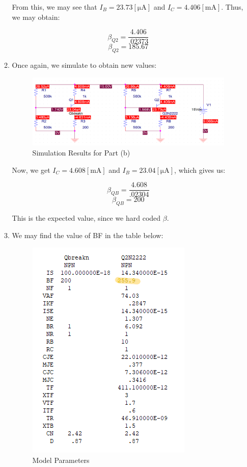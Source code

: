 \begin{enumerate}
\begin{enumerate}
        From this, we may see that $I_B=23.73[\si{\micro\ampere}]$ and $I_C=4.406[\si{\milli\ampere}]$. Thus, we may obtain:

        $$\beta_{Q2}=\frac{4.406}{.02373}$$
        $$\boxed{\beta_{Q2}=185.67}$$

      \item 

        Once again, we simulate to obtain new values:

        \begin{figure}[H]
          \centering
          \includegraphics[width=.9\textwidth]{Figures/HW5-5b}
          \caption{Simulation Results for Part (b)}
          \label{fig:2}
        \end{figure}

        Now, we get $I_C=4.608[\si{\milli\ampere}]$ and $I_B=23.04[\si{\micro\ampere}]$, which gives us:

        $$\beta_{QB}=\frac{4.608}{.02304}$$
        $$\boxed{\beta_{QB}=200}$$

        This is the expected value, since we hard coded $\beta$.

      \item 

        We may find the value of BF in the table below:

        \begin{figure}[H]
          \centering
          \includegraphics[width=.5\textwidth]{Figures/HW5-5c1}
          \caption{Model Parameters}
          \label{fig:3}
        \end{figure}


\end{enumerate}
\end{enumerate}
